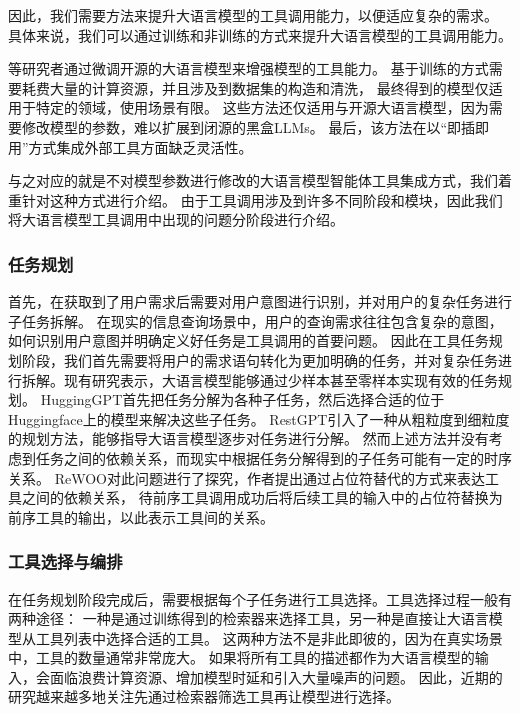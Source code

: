 因此，我们需要方法来提升大语言模型的工具调用能力，以便适应复杂的需求。
具体来说，我们可以通过训练和非训练的方式来提升大语言模型的工具调用能力。



\cite{Qin2023, schick2024toolformer, hao2024toolkengpt, parisi2022talm}等研究者通过微调开源的大语言模型来增强模型的工具能力。
基于训练的方式需要耗费大量的计算资源，并且涉及到数据集的构造和清洗，
最终得到的模型仅适用于特定的领域，使用场景有限。
这些方法还仅适用与开源大语言模型，因为需要修改模型的参数，难以扩展到闭源的黑盒LLMs。
最后，该方法在以“即插即用”方式集成外部工具方面缺乏灵活性。

与之对应的就是不对模型参数进行修改的大语言模型智能体工具集成方式，我们着重针对这种方式进行介绍。
由于工具调用涉及到许多不同阶段和模块，因此我们将大语言模型工具调用中出现的问题分阶段进行介绍。



\subsubsection{任务规划}

首先，在获取到了用户需求后需要对用户意图进行识别，并对用户的复杂任务进行子任务拆解。
在现实的信息查询场景中，用户的查询需求往往包含复杂的意图，如何识别用户意图并明确定义好任务是工具调用的首要问题。
因此在工具任务规划阶段，我们首先需要将用户的需求语句转化为更加明确的任务，并对复杂任务进行拆解。现有研究\cite{Miao2023}表示，大语言模型能够通过少样本甚至零样本实现有效的任务规划。
HuggingGPT\cite{Shen2023}首先把任务分解为各种子任务，然后选择合适的位于Huggingface上的模型来解决这些子任务。
RestGPT\cite{Song2023}引入了一种从粗粒度到细粒度的规划方法，能够指导大语言模型逐步对任务进行分解。
然而上述方法并没有考虑到任务之间的依赖关系，而现实中根据任务分解得到的子任务可能有一定的时序关系。
ReWOO\cite{xu2023rewoo}对此问题进行了探究，作者提出通过占位符替代的方式来表达工具之间的依赖关系，
待前序工具调用成功后将后续工具的输入中的占位符替换为前序工具的输出，以此表示工具间的关系。

\subsubsection{工具选择与编排}

在任务规划阶段完成后，需要根据每个子任务进行工具选择。工具选择过程一般有两种途径：
一种是通过训练得到的检索器来选择工具，另一种是直接让大语言模型从工具列表中选择合适的工具。
这两种方法不是非此即彼的，因为在真实场景中，工具的数量通常非常庞大。
如果将所有工具的描述都作为大语言模型的输入，会面临浪费计算资源、增加模型时延和引入大量噪声的问题。
因此，近期的研究越来越多地关注先通过检索器筛选工具再让模型进行选择。

